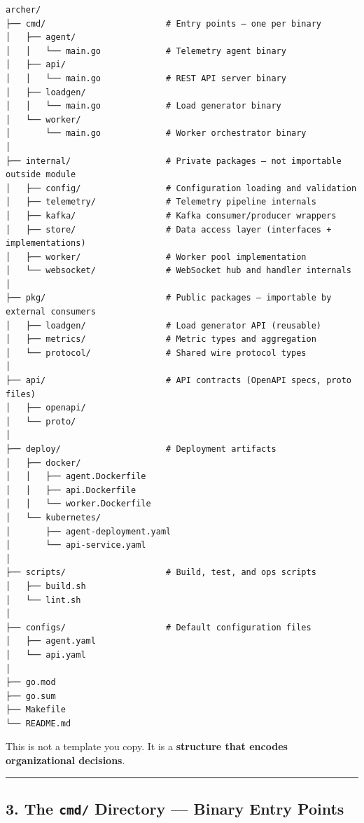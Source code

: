 \documentclass[11pt,openany]{book}
\begin{document}
\begin{verbatim}
archer/
├── cmd/                        # Entry points — one per binary
│   ├── agent/
│   │   └── main.go             # Telemetry agent binary
│   ├── api/
│   │   └── main.go             # REST API server binary
│   ├── loadgen/
│   │   └── main.go             # Load generator binary
│   └── worker/
│       └── main.go             # Worker orchestrator binary
│
├── internal/                   # Private packages — not importable outside module
│   ├── config/                 # Configuration loading and validation
│   ├── telemetry/              # Telemetry pipeline internals
│   ├── kafka/                  # Kafka consumer/producer wrappers
│   ├── store/                  # Data access layer (interfaces + implementations)
│   ├── worker/                 # Worker pool implementation
│   └── websocket/              # WebSocket hub and handler internals
│
├── pkg/                        # Public packages — importable by external consumers
│   ├── loadgen/                # Load generator API (reusable)
│   ├── metrics/                # Metric types and aggregation
│   └── protocol/               # Shared wire protocol types
│
├── api/                        # API contracts (OpenAPI specs, proto files)
│   ├── openapi/
│   └── proto/
│
├── deploy/                     # Deployment artifacts
│   ├── docker/
│   │   ├── agent.Dockerfile
│   │   ├── api.Dockerfile
│   │   └── worker.Dockerfile
│   └── kubernetes/
│       ├── agent-deployment.yaml
│       └── api-service.yaml
│
├── scripts/                    # Build, test, and ops scripts
│   ├── build.sh
│   └── lint.sh
│
├── configs/                    # Default configuration files
│   ├── agent.yaml
│   └── api.yaml
│
├── go.mod
├── go.sum
├── Makefile
└── README.md
\end{verbatim}

This is not a template you copy. It is a \textbf{structure that encodes
organizational decisions}.

\begin{center}\rule{0.5\linewidth}{0.5pt}\end{center}

\hypertarget{the-cmd-directory-binary-entry-points}{%
\subsection{\texorpdfstring{3. The \texttt{cmd/} Directory --- Binary
Entry
Points}{3. The cmd/ Directory --- Binary Entry Points}}\label{the-cmd-directory-binary-entry-points}}
\end{document}
